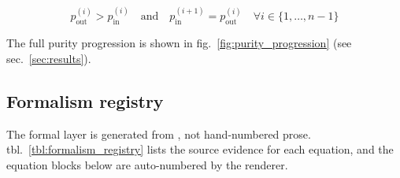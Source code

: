 \documentclass[
]{article}
\begin{document}
\[
p_{\text{out}}^{(i)} > p_{\text{in}}^{(i)} \quad \text{and} \quad p_{\text{in}}^{(i+1)} = p_{\text{out}}^{(i)} \quad \forall i \in \{1, \ldots, n-1\}
\]

The full purity progression is shown in
fig.~\ref{fig:purity_progression} (see sec.~\ref{sec:results}).

\subsection{Formalism registry}\label{formalism-registry}

The formal layer is generated from , not
hand-numbered prose. tbl.~\ref{tbl:formalism_registry} lists the source
evidence for each equation, and the equation blocks below are
auto-numbered by the renderer.
\end{document}
